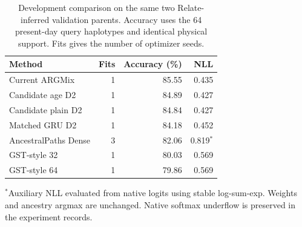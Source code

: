 \begin{table}[t]
\centering
\caption{Development comparison on the same two Relate-inferred validation parents. Accuracy uses the 64 present-day query haplotypes and identical physical support. Fits gives the number of optimizer seeds.}
\label{tab:biological-development}
\begin{tabular}{lrrr}
\toprule
Method & Fits & Accuracy (\%) & NLL \\
\midrule
Current ARGMix & 1 & 85.55 & 0.435 \\
Candidate age D2 & 1 & 84.89 & 0.427 \\
Candidate plain D2 & 1 & 84.84 & 0.427 \\
Matched GRU D2 & 1 & 84.18 & 0.452 \\
AncestralPaths Dense & 3 & 82.06 & 0.819$^{*}$ \\
GST-style 32 & 1 & 80.03 & 0.569 \\
GST-style 64 & 1 & 79.86 & 0.569 \\
\bottomrule
\end{tabular}
\par\smallskip
\parbox{\columnwidth}{\footnotesize $^{*}$Auxiliary NLL evaluated from native logits using stable log-sum-exp. Weights and ancestry argmax are unchanged. Native softmax underflow is preserved in the experiment records.}
\end{table}
